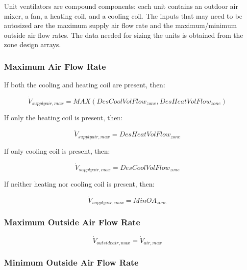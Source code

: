 Unit ventilators are compound components: each unit contains an outdoor air mixer, a fan, a heating coil, and a cooling coil. The inputs that may need to be autosized are the maximum supply air flow rate and the maximum/minimum outside air flow rates. The data needed for sizing the units is obtained from the zone design arrays.

\subsubsection{Maximum Air Flow Rate}\label{maximum-air-flow-rate-2}

If both the cooling and heating coil are present, then:

\begin{equation}
{\dot V_{supplyair,max}} = MAX\left( {DesCoolVolFlo{w_{zone}},DesHeatVolFlo{w_{zone}}} \right)
\end{equation}

If only the heating coil is present, then:

\begin{equation}
{\dot V_{supplyair,max}} = DesHeatVolFlo{w_{zone}}
\end{equation}

If only cooling coil is present, then:

\begin{equation}
{\dot V_{supplyair,max}} = DesCoolVolFlo{w_{zone}}
\end{equation}

If neither heating nor cooling coil is present, then:

\begin{equation}
{\dot V_{supplyair,max}} = MinO{A_{zone}}
\end{equation}

\subsubsection{Maximum Outside Air Flow Rate}\label{maximum-outside-air-flow-rate-2}

\begin{equation}
{\dot V_{outsideair,max}} = {\dot V_{air,max}}
\end{equation}

\subsubsection{Minimum Outside Air Flow Rate}\label{minimum-outside-air-flow-rate}

